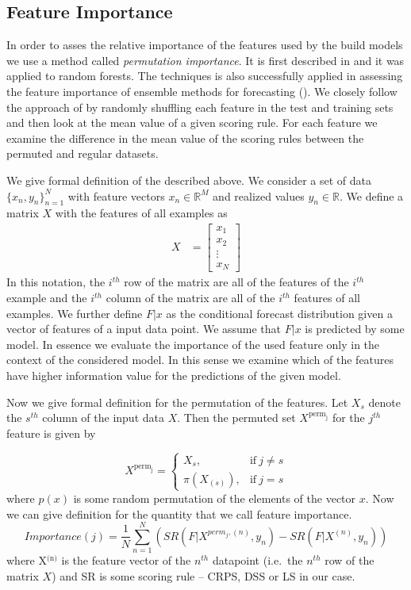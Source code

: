 \documentclass[12pt,a4paper,twoside]{scrartcl}
\numberwithin{equation}{section}
\begin{document}
\subsection{Feature Importance}\label{sec:feature-importance}
In order to asses the relative importance of the features used by the build models we use a method called \emph{permutation importance}. It is first described in  \cite{breiman2001} and it was applied to random forests. The techniques is also successfully applied in assessing the feature importance of ensemble methods for forecasting (\cite{lerch2018}). We closely follow the approach of \cite{lerch2018} by randomly shuffling each feature in the test and training sets and then look at the mean value of a given scoring rule. For each feature we examine the difference in the mean value of the scoring rules between the permuted and regular datasets.

We give formal definition of the described above. We consider a set of data \(\{x_n, y_n\}_{n=1}^N\) with feature vectors \(x_n\in\mathbb{R}^M\) and realized values \(y_n\in\mathbb{R}\). We define a matrix \(X\) with the features of all examples as
\begin{align}
  X &= \begin{bmatrix}
    x_{1} \\
    x_{2} \\
    \vdots \\
    x_{N}
  \end{bmatrix}
\end{align}
In this notation, the \(i^{th}\) row of the matrix are all of the features of the \(i^{th}\) example and the \(i^{th}\) column of the matrix are all of the \(i^{th}\) features of all examples. We further define \(F|x\) as the conditional forecast distribution given a vector of features of a input data point. We assume that \(F|x\) is predicted by some model. In essence we evaluate the importance of the used feature only in the context of the considered model. In this sense we examine which of the features have higher information value for the predictions of the given model.

Now we give formal definition for the permutation of the features. Let \(X_s\) denote the \(s^{th}\) column of the input data \(X\). Then the permuted set \(X^{\text{perm}_{\text{j}}}\) for the \(j^{th}\) feature is given by

\begin{equation}
  X^{\text{perm}_{\text{j}}} = 
  \begin{cases}
    X_{s},        & \text{if}\  j \neq s \\
    \pi(X_{(s)}), & \text{if}\  j = s
  \end{cases}
\end{equation}
where \(p(x)\) is some random permutation of the elements of the vector \(x\). Now we can give definition for the quantity that we call feature importance.
\begin{equation}
  \textit{Importance}(j) = \frac{1}{N}\sum_{n=1}^N (SR(F|X^{perm_j,(n)}, y_n) - SR(F|X^{(n)}, y_n) )
\end{equation}
where X\(^{\text{(n)}}\) is the feature vector of the \(n^{th}\) datapoint (i.e.\ the \(n^{th}\) row of the matrix \(X\)) and SR is some scoring rule -- CRPS, DSS or LS in our case.
\end{document}
